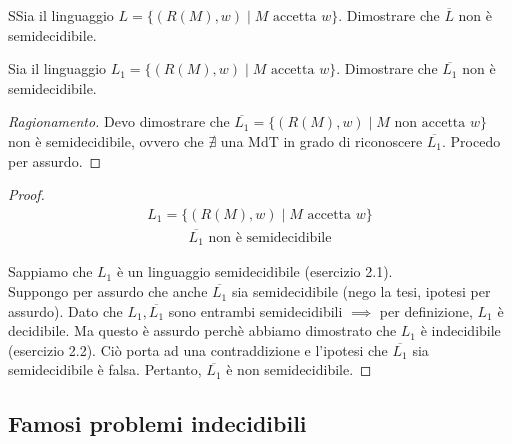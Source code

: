 \documentclass{article}  %
\theoremstyle{definition}
\newenvironment{ragionamento}[1][]
  {\begin{proof}[Ragionamento#1]\renewcommand{\qedsymbol}{}\normalfont}
  {\end{proof}}
\begin{document}
\begin{theorem}{}
  SSia il linguaggio $L = \{(R(M), w) \mid M \text{ accetta } w\}$. Dimostrare che $\overline{L}$ non è semidecidibile.
\end{theorem}
\begin{esercizio}[Esercizio 2.3]
  \footnotesize %
Sia il linguaggio $L_1 = \{(R(M), w) \mid M \text{ accetta } w\}$. Dimostrare che $\overline{L_1}$ non è semidecidibile.
\begin{ragionamento}
  Devo dimostrare che $\overline{L_1}=\{(R(M), w) \mid M \text{ non accetta } w\}$ non è semidecidibile, ovvero che $\nexists$ una MdT in grado 
  di riconoscere $\overline{L_1}$. Procedo per assurdo.
\end{ragionamento}
\begin{proof}
  \begin{align*}
  L_1 = \{(R(M), w) \mid M \text{ accetta } w\} \tag*{(ipotesi)}
\end{align*}
\begin{align*}
  \overline{L_1} \text{ non è semidecidibile} \tag*{(tesi)}
\end{align*}

  Sappiamo che $L_1$ è un linguaggio semidecidibile (esercizio 2.1). \\
  Suppongo per assurdo che anche $\overline{L_1}$ sia semidecidibile (nego la tesi, ipotesi per assurdo). 
  Dato che $L_1, \overline{L_1}$ sono entrambi semidecidibili $\implies$ per definizione, $L_1$ è decidibile. Ma questo è assurdo perchè abbiamo dimostrato
  che $L_1$ è indecidibile (esercizio 2.2). Ciò porta ad una contraddizione e l'ipotesi che $\overline{L_1}$ sia semidecidibile è falsa. 
  Pertanto, $\overline{L_1}$ è non semidecidibile. 

\end{proof}
\end{esercizio}
\break
\subsection{Famosi problemi indecidibili}
\end{document}
